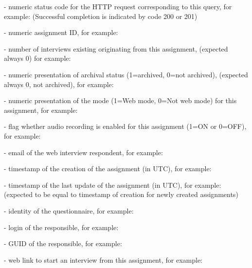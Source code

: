 \savedres
\begin{compactitem}

    \item {} - numeric status code for the HTTP
    request corresponding to this query, for example:
    \newline
    (Successful completion is indicated by code 200 or 201)

    \item {} - numeric assignment ID, for example:

    \item {} - number of interviews existing
    originating from this assignment, (expected always 0) for example:

    \item {} - numeric presentation of archival status
    (1=archived, 0=not archived), (expected always 0, not archived), for
    example:

    \item {} - numeric presentation of the mode
    (1=Web mode, 0=Not web mode) for this assignment, for example:

    \item {} - flag whether audio
    recording is enabled for this assignment (1=ON or 0=OFF), for example:

    \item {} - email of the web interview respondent, for
    example:

    \item {} - timestamp of the creation of the
    assignment (in UTC), for example:

    \item {} - timestamp of the last update of the
    assignment (in UTC), for example:
    \newline
    (expected to be equal to timestamp of creation for newly created assignments)

    \item {} - identity of the questionnaire, for
    example:

    \item {} - login of the responsible, for
    example:

    \item {} - GUID of the responsible, for example:

    \item {} - web link to start an interview
    from this assignment, for example:

\end{compactitem}

